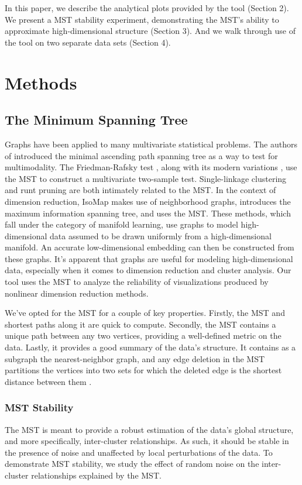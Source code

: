 \documentclass{article}
\begin{document}
{In this paper, we describe the analytical plots provided by the tool (Section 2). We present a MST stability experiment, demonstrating the MST's ability to approximate high-dimensional structure (Section 3). And we walk through use of the tool on two separate data sets (Section 4).
\section{Methods}

\subsection{The Minimum Spanning Tree}
Graphs have been applied to many multivariate statistical problems. The authors of \cite{MAP_test} introduced the minimal ascending path spanning tree as a way to test for multimodality. The Friedman-Rafsky test \cite{Friedman-Rafsky_test}, along with its modern variations \cite{Friedman-Rafsky1, Friedman-Rafsky2, Friedman-Rafsky3}, use the MST to construct a multivariate two-sample test. Single-linkage clustering \cite{single-linkage} and runt pruning \cite{runt_pruning} are both intimately related to the MST. In the context of dimension reduction, IsoMap \cite{IsoMap} makes use of neighborhood graphs, \cite{MIST_example} introduces the maximum information spanning tree, and \cite{MST_example} uses the MST. These methods, which fall under the category of manifold learning, use graphs to model high-dimensional data assumed to be drawn uniformly from a high-dimensional manifold. An accurate low-dimensional embedding can then be constructed from these graphs. It's apparent that graphs are useful for modeling high-dimensional data, especially when it comes to dimension reduction and cluster analysis. Our tool uses the MST to analyze the reliability of visualizations produced by nonlinear dimension reduction methods.

We've opted for the MST for a couple of key properties. Firstly, the MST and shortest paths along it are quick to compute. Secondly, the MST contains a unique path between any two vertices, providing a well-defined metric on the data. Lastly, it provides a good summary of the data's structure. It contains as a subgraph the nearest-neighbor graph, and any edge deletion in the MST partitions the vertices into two sets for which the deleted edge is the shortest distance between them \cite{Friedman-Rafsky_test}.

\subsubsection{MST Stability}
The MST is meant to provide a robust estimation of the data's global structure, and more specifically, inter-cluster relationships. As such, it should be stable in the presence of noise and unaffected by local perturbations of the data. To demonstrate MST stability, we study the effect of random noise on the inter-cluster relationships explained by the MST.

}
\end{document}
